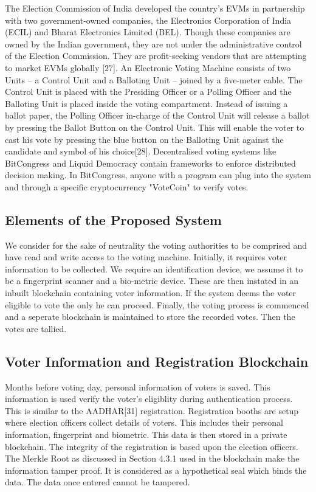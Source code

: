 \documentclass{article}
\begin{document}
The Election Commission of India developed the country’s EVMs in partnership with two government-owned companies, the Electronics Corporation of India (ECIL) and Bharat Electronics Limited (BEL). Though these companies are owned by the Indian government, they are not under the administrative control of the Election Commission. They are profit-seeking vendors that are attempting to market EVMs globally [27].  An Electronic Voting Machine consists of two Units – a Control Unit and a Balloting Unit – joined by a five-meter cable. The Control Unit is placed with the Presiding Officer or a Polling Officer and the Balloting Unit is placed inside the voting compartment. Instead of issuing a ballot paper, the Polling Officer in-charge of the Control Unit will release a ballot by pressing the Ballot Button on the Control Unit. This will enable the voter to cast his vote by pressing the blue button on the Balloting Unit against the candidate and symbol of his choice[28].  Decentralised voting systems like BitCongress and Liquid Democracy contain frameworks to enforce distributed decision making. In BitCongress, anyone with a program can plug into the system and through a specific cryptocurrency "VoteCoin" to verify votes. 

\subsection{Elements of the Proposed System}
We consider for the sake of neutrality the voting authorities to be comprised and have read and write access to the voting machine. Initially, it requires voter information to be collected.
We require an identification device, we assume it to be a fingerprint scanner and a bio-metric device. These are then instated in an inbuilt blockchain containing voter information. If the system deems the voter eligible to vote the only he can proceed.
Finally, the voting process is commenced and a seperate blockchain is maintained to store the recorded votes. Then the votes are tallied.
\subsection{Voter Information and Registration Blockchain}
Months before voting day, personal information of voters is saved. This information is used verify the voter's eligiblity during authentication process. This is similar to the AADHAR[31] registration. Registration booths are setup where election officers collect details of voters. This includes their personal information, fingerprint and biometric. This data is then stored in a private blockchain. The integrity of the registration is based upon the election officers.\\
The Merkle Root as discussed in Section 4.3.1  used in the blockchain make the information tamper proof. It is considered as a hypothetical seal which binds the data. The data once entered cannot be tampered.
\end{document}
